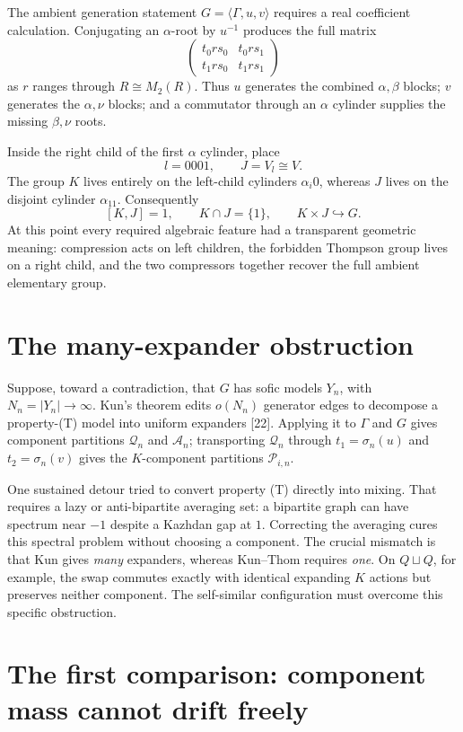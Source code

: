 \documentclass[10pt,openany]{book}
\newcommand{\refnum}[1]{\textnormal{[#1]}}
\begin{document}
The ambient generation statement $G=\langle\Gamma,u,v\rangle$ requires a real coefficient calculation. Conjugating an $\alpha$-root by $u^{-1}$ produces the full matrix
\[
 \begin{pmatrix}
 t_0rs_0 & t_0rs_1\\
 t_1rs_0 & t_1rs_1
 \end{pmatrix}
\]
as $r$ ranges through $R\cong M_2(R)$. Thus $u$ generates the combined $\alpha,\beta$ blocks; $v$ generates the $\alpha,\nu$ blocks; and a commutator through an $\alpha$ cylinder supplies the missing $\beta,\nu$ roots.

Inside the right child of the first $\alpha$ cylinder, place
\[
 l=0001,
 \qquad
 J=V_l\cong V.
\]
The group $K$ lives entirely on the left-child cylinders $\alpha_i0$, whereas $J$ lives on the disjoint cylinder $\alpha_11$. Consequently
\[
 [K,J]=1,
 \qquad
 K\cap J=\{1\},
 \qquad
 K\times J\hookrightarrow G.
\]
At this point every required algebraic feature had a transparent geometric meaning: compression acts on left children, the forbidden Thompson group lives on a right child, and the two compressors together recover the full ambient elementary group.

\section{The many-expander obstruction}

Suppose, toward a contradiction, that $G$ has sofic models $Y_n$, with $N_n=|Y_n|\to\infty$. Kun's theorem edits $o(N_n)$ generator edges to decompose a property-(T) model into uniform expanders \refnum{22}. Applying it to $\Gamma$ and $G$ gives component partitions $\mathcal{Q}_n$ and $\mathcal{A}_n$; transporting $\mathcal{Q}_n$ through $t_1=\sigma_n(u)$ and $t_2=\sigma_n(v)$ gives the $K$-component partitions $\mathcal{P}_{i,n}$.

One sustained detour tried to convert property (T) directly into mixing. That requires a lazy or anti-bipartite averaging set: a bipartite graph can have spectrum near $-1$ despite a Kazhdan gap at $1$. Correcting the averaging cures this spectral problem without choosing a component. The crucial mismatch is that Kun gives \emph{many} expanders, whereas Kun--Thom requires \emph{one}. On $Q\sqcup Q$, for example, the swap commutes exactly with identical expanding $K$ actions but preserves neither component. The self-similar configuration must overcome this specific obstruction.

\section{The first comparison: component mass cannot drift freely}
\end{document}
